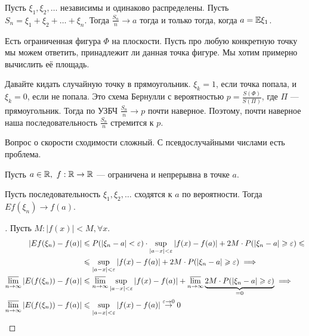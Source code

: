 \documentclass[../main.tex]{subfiles}
\begin{document}
\begin{thm}
 Пусть $ \xi_1, \xi_2, \ldots $  независимы и одинаково распределены. Пусть $ S_n  = \xi_1 + \xi_2 + \ldots + \xi_n $. Тогда $ \frac{S_n}{n} \to a $ тогда и только тогда, когда $ a = \mathbb E \xi_1 $.
\end{thm}

\begin{exmpl}
Есть ограниченная фигура $ \Phi $ на плоскости. Пусть про любую конкретную точку мы можем ответить, принадлежит ли данная точка фигуре. Мы хотим примерно вычислить её площадь.

 Давайте кидать случайную точку в прямоугольник. $ \xi_k = 1 $, если точка попала, и $ \xi_k = 0 $, если не попала. Это схема Бернулли с вероятностью $ p = \frac{S(\Phi)}{S(\Pi)} $, где $ \Pi $ --- прямоугольник. Тогда по УЗБЧ  $ \frac{S_n}{n} \to p $  почти наверное. Поэтому, почти наверное наша последовательность $ \frac{S_n}{n} $ стремится к $ p $.

 Вопрос о скорости сходимости сложный. С псевдослучайными числами есть проблема.
\end{exmpl}

\begin{thm}
	Пусть $a \in \mathbb{R}, \ f : \mathbb{R} \to \mathbb{R}$ --- ограничена и непрерывна в точке $a$.

	Пусть последовательность $\xi_1, \xi_2, \ldots$ сходятся к $a$ по вероятности.
	Тогда $E f(\xi_n) \to f(a)$. 
\end{thm}
\begin{proof}[]
	Пусть $M: |f(x)| < M, \forall x$.
  \begin{align*}
	|E f(\xi_n) - f(a)| &\leqslant P(|\xi_n - a| < \varepsilon) \cdot \sup_{|a - x| < \varepsilon} |f(x) - f(a)| + 2M \cdot P(|\xi_n - a| \geqslant \varepsilon) \leqslant \\
	& \leqslant \sup_{|a - x| < \varepsilon} |f(x) - f(a)| + 2M \cdot P(|\xi_n - a| \geqslant \varepsilon) \implies \\
	\varlimsup_{n \to \infty} |E(f(\xi_n)) - f(a)| &\leqslant \varlimsup_{n \to \infty} \sup_{|a - x| < \varepsilon} |f(x) - f(a)| + \varlimsup_{n \to \infty} \underbrace{2M \cdot P(|\xi_n - a| \geqslant \varepsilon)}_{=0} \implies  \\
	\varlimsup_{n \to \infty} |E(f(\xi_n)) - f(a)| &\leqslant \sup_{|a - x| < \varepsilon} |f(x) - f(a)| \overset{\varepsilon \to 0}{\to} 0
  \end{align*}
\end{proof}
\end{document}
